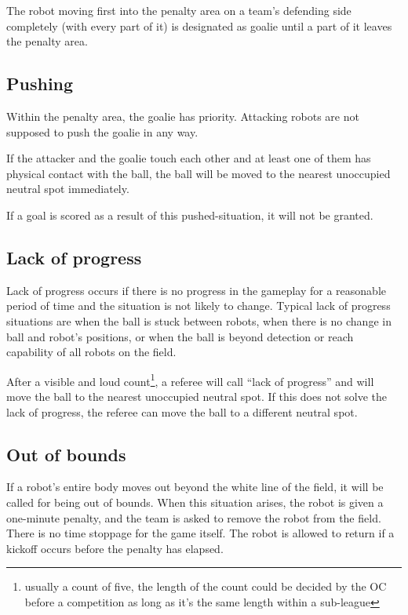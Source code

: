\documentclass{article}
\begin{document}
The robot moving first into the penalty area on a team's defending side
completely (with every part of it) is designated as goalie until a part of it
leaves the penalty area.

\subsection{Pushing \label{ref-009}}

Within the penalty area, the goalie has priority. Attacking robots are not
supposed to push the goalie in any way.

If the attacker and the goalie touch each other and at least one of them has
physical contact with the ball, the ball will be moved to the nearest
unoccupied neutral spot immediately.

If a goal is scored as a result of this pushed-situation, it will not be
granted.

\subsection{Lack of progress \label{ref-010}}

Lack of progress occurs if there is no progress in the gameplay for a
reasonable period of time and the situation is not likely to change. Typical
lack of progress situations are when the ball is stuck between robots, when
there is no change in ball and robot's positions, or when the ball is beyond
detection or reach capability of all robots on the field.

After a visible and loud count\footnote{usually a count of five, the length of
the count could be decided by the OC before a competition as long as it's
the same length within a sub-league}, a referee will call ``lack of
progress'' and will move the ball to the nearest unoccupied neutral spot. If
this does not solve the lack of progress, the referee can move the ball to a
different neutral spot.

\subsection{Out of bounds \label{ref-011}}

If a robot's entire body moves out beyond the white line of the field, it
will be called for being out of bounds. When this situation arises, the robot
is given a one-minute penalty, and the team is asked to remove the robot from
the field. There is no time stoppage for the game itself. The robot is allowed
to return if a kickoff occurs before the penalty has elapsed.
\end{document}
